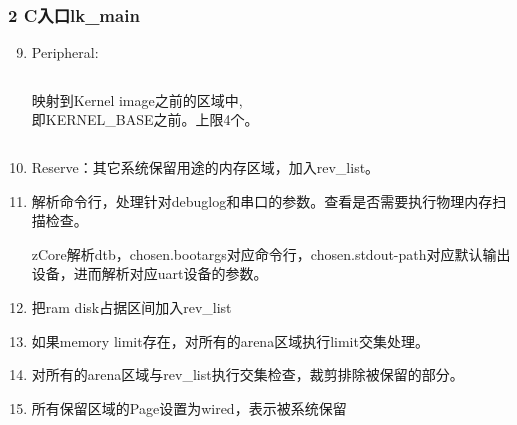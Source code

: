 \documentclass[
8pt, %
]{beamer}
\begin{document}
	\begin{frame}
		\frametitle{2 C入口lk\_main}
		\begin{enumerate}\setcounter{enumi}{8}
			\item Peripheral:
            \begin{columns}[c]
                \begin{column}{0.5\textwidth}
                    \begin{center}
                        映射到Kernel image之前的区域中, \\
                        即KERNEL\_BASE之前。上限4个。
                    \end{center}
                \end{column}
                \begin{column}{0.45\textwidth}
                \end{column}
            \end{columns}
			\item Reserve：其它系统保留用途的内存区域，加入rev\_list。
			\item 解析命令行，处理针对debuglog和串口的参数。查看是否需要执行物理内存扫描检查。
			\begin{block}{}
				zCore解析dtb，chosen.bootargs对应命令行，chosen.stdout-path对应默认输出设备，进而解析对应uart设备的参数。
			\end{block}
			\item 把ram disk占据区间加入rev\_list
			\item 如果memory limit存在，对所有的arena区域执行limit交集处理。
			\item 对所有的arena区域与rev\_list执行交集检查，裁剪排除被保留的部分。
			\item 所有保留区域的Page设置为wired，表示被系统保留
		\end{enumerate}
	\end{frame}
\end{document}
